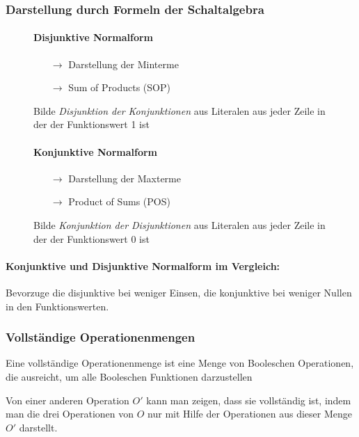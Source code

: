 \documentclass[12pt]{report}
\begin{document}
\subsubsection{Darstellung durch Formeln der Schaltalgebra}
\begin{figure}[H]
  \begin{minipage}{0.46\textwidth}
    \paragraph{Disjunktive Normalform}
    \begin{itemize}
      \item[$\rightarrow$] Darstellung der Minterme
      \item[$\rightarrow$] Sum of Products (SOP)
    \end{itemize}
    Bilde \textit{Disjunktion der Konjunktionen} aus Literalen aus jeder Zeile in der der Funktionswert 1 ist
  \end{minipage}
  \hfill
  \begin{minipage}{0.46\textwidth}
    \paragraph{Konjunktive Normalform}
    \begin{itemize}
      \item[$\rightarrow$] Darstellung der Maxterme
      \item[$\rightarrow$] Product of Sums (POS)
    \end{itemize}
    Bilde \textit{Konjunktion der Disjunktionen} aus Literalen aus jeder Zeile in der der Funktionswert 0 ist
  \end{minipage}
\end{figure}

\paragraph{Konjunktive und Disjunktive Normalform im Vergleich:}
Bevorzuge die disjunktive bei weniger Einsen, die konjunktive
bei weniger Nullen in den Funktionswerten.

\subsubsection{Vollständige Operationenmengen}
\begin{defbox}
  Eine vollständige Operationenmenge ist eine Menge von Booleschen Operationen, die ausreicht, um alle Booleschen Funktionen darzustellen
\end{defbox}
Von einer anderen Operation $O'$ kann man zeigen, dass sie vollständig ist, indem man die drei Operationen von $O$ nur mit Hilfe der Operationen aus dieser Menge $O'$ darstellt.
\end{document}
